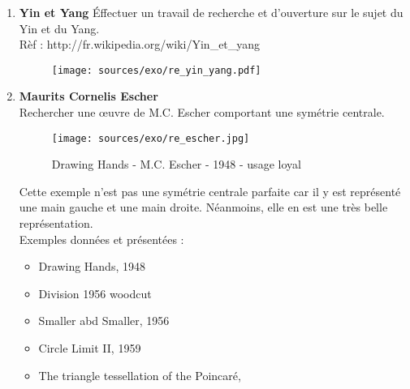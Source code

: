 \documentclass[11pt]{article}
\begin{document}
\begin{enumerate}
\item \textbf{Yin et Yang}
  Éffectuer un travail de recherche et d'ouverture sur le sujet du Yin et du Yang.\\
  Rèf : http://fr.wikipedia.org/wiki/Yin\_et\_yang\\

  \begin{figure}[H]
    \centering
    \texttt{[image: sources/exo/re\_yin\_yang.pdf]}
    \label{fig:ch2-yy}
  \end{figure}
  
\item \textbf{Maurits Cornelis Escher}\\
  Rechercher une œuvre de M.C. Escher comportant une symétrie centrale.
  
  \begin{figure}[H]
    \centering
    \texttt{[image: sources/exo/re\_escher.jpg]}
    \caption{Drawing Hands  - M.C. Escher - 1948 - usage loyal}
    \label{fig:ch2-escher}
  \end{figure}
  Cette exemple n'est pas une symétrie centrale parfaite car il y est représenté une main gauche et une main droite. Néanmoins, elle en est une très belle représentation.\\
  
  Exemples données et présentées : 
  \begin{itemize}
  \item Drawing Hands, 1948
  \item Division 1956 woodcut
  \item Smaller abd Smaller, 1956
  \item Circle Limit II, 1959
  \item The triangle tessellation of the Poincaré, 
  \end{itemize}
  
\end{enumerate}
\end{document}

